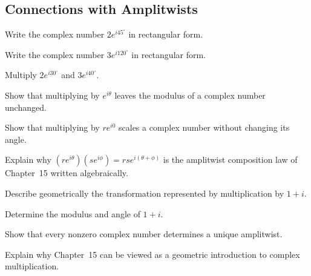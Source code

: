 \subsection*{Connections with Amplitwists}
\begin{exercise}
Write the complex number $2e^{i45^\circ}$ in rectangular form.
\end{exercise}
\begin{exercise}
Write the complex number $3e^{i120^\circ}$ in rectangular form.
\end{exercise}
\begin{exercise}
Multiply $2e^{i30^\circ}$ and $3e^{i40^\circ}$.
\end{exercise}
\begin{exercise}
Show that multiplying by $e^{i\theta}$ leaves the modulus of a complex
number unchanged.
\end{exercise}
\begin{exercise}
Show that multiplying by $re^{i0}$ scales a complex number without
changing its angle.
\end{exercise}
\begin{exercise}
Explain why $(re^{i\theta})(se^{i\phi}) = rse^{i(\theta+\phi)}$ is the
amplitwist composition law of Chapter~15 written algebraically.
\end{exercise}
\begin{exercise}
Describe geometrically the transformation represented by multiplication
by $1+i$.
\end{exercise}
\begin{exercise}
Determine the modulus and angle of $1+i$.
\end{exercise}
\begin{exercise}
Show that every nonzero complex number determines a unique amplitwist.
\end{exercise}
\begin{exercise}
Explain why Chapter~15 can be viewed as a geometric introduction to
complex multiplication.
\end{exercise}


